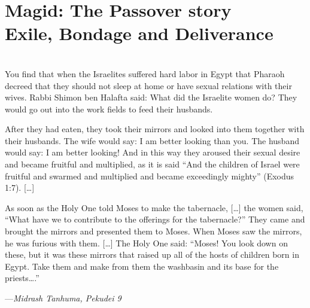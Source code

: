 \documentclass[a4paper,10pt,openany]{memoir}
\newcommand{\HgEllipsis}{\ensuremath{\left[\ldots\right]}}
\newcommand{\HgSource}[1]{\hfill{\small---\itshape{#1}}}
\newenvironment{HgEnglish}{\strut\\\noindent}{\vspace{1em}}
\begin{document}

%


\chapter*{Magid: The Passover story \\ {\LARGE Exile, Bondage and Deliverance}}

\begin{HgEnglish}
You find that when the Israelites suffered hard labor in Egypt that Pharaoh
decreed that they should not sleep at home or have sexual relations with their
wives. Rabbi Shimon ben Halafta said: What did the Israelite women do? 
They would 
go out into the work fields to feed their husbands. 
 
After they had eaten, they took their mirrors and looked into them together with
their husbands.  The wife would say: I am better looking than you. The husband
would say: I am better looking! And in this way they aroused their sexual desire
and became fruitful and multiplied, as it is said ``And the children of Israel
were fruitful and swarmed and multiplied and became exceedingly mighty'' (Exodus
1:7). [\ldots]
 

As soon as the Holy One told Moses to make the tabernacle, 
[\ldots]
the women said,
``What have we to contribute to the offerings for the tabernacle?'' They came and
brought the mirrors and presented them to Moses.  When Moses saw the mirrors, he
was furious with them. 
[\ldots]
The Holy One said: ``Moses! You look down on these, but it was these mirrors that
raised up all of the hosts of children born in Egypt. Take them and make from
them the washbasin and its base for the priests\ldots.''


\HgSource{Midrash Tanhuma, Pekudei 9}
\end{HgEnglish}
\end{document}
